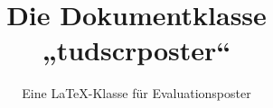 \documentclass[%
  english,ngerman,%
  DIV=13,
  cdfoot=51pt,
  titlepage=no,headings=optiontotoc,abstract=sec,
]%
{tudscrposter}
\begin{document}
\title{Die Dokumentklasse „tudscrposter“}
\subtitle{Eine \LaTeX-Klasse für Evaluationsposter}

\maketitle%

\blindtext
\blindtext
\blindtext


\fmtversion
\end{document}
